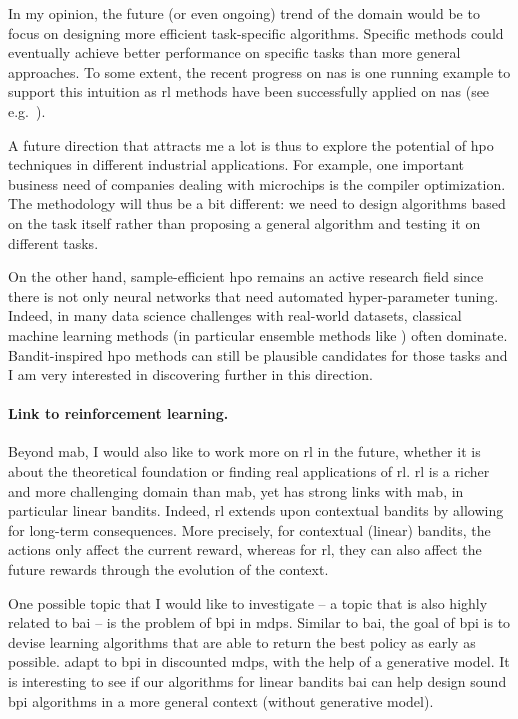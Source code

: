 In my opinion, the future (or even ongoing) trend of the domain would be to focus on designing more efficient task-specific algorithms. Specific methods could eventually achieve better performance on specific tasks than more general approaches. To some extent, the recent progress on \gls{nas} is one running example to support this intuition as \gls{rl} methods have been successfully applied on \gls{nas} (see e.g.~\citealt{zoph2017}).

A future direction that attracts me a lot is thus to explore the potential of \gls{hpo} techniques in different industrial applications. For example, one important business need of companies dealing with microchips is the compiler optimization. The methodology will thus be a bit different: we need to design algorithms based on the task itself rather than proposing a general algorithm and testing it on different tasks.

On the other hand, sample-efficient \gls{hpo} remains an active research field since there is not only neural networks that need automated hyper-parameter tuning. Indeed, in many data science challenges with real-world datasets, classical machine learning methods (in particular ensemble methods like \XG{}) often dominate. Bandit-inspired \gls{hpo} methods can still be plausible candidates for those tasks and I am very interested in discovering further in this direction.

\paragraph{Link to reinforcement learning.}
Beyond \gls{mab}, I would also like to work more on \gls{rl} in the future, whether it is about the theoretical foundation or finding real applications of \gls{rl}. \gls{rl} is a richer and more challenging domain than \gls{mab}, yet has strong links with \gls{mab}, in particular linear bandits. Indeed, \gls{rl} extends upon contextual bandits by allowing for long-term consequences. More precisely, for contextual (linear) bandits, the actions only affect the current reward, whereas for \gls{rl}, they can also affect the future rewards through the evolution of the context.


One possible topic that I would like to investigate -- a topic that is also highly related to \gls{bai} -- is the problem of \gls{bpi} in \gls{mdp}s. Similar to \gls{bai}, the goal of \gls{bpi} is to devise learning algorithms that are able to return the best policy as early as possible. \cite{marjani2020bpi} adapt \Track to \gls{bpi} in discounted \gls{mdp}s, with the help of a generative model. It is interesting to see if our algorithms for linear bandits \gls{bai} can help design sound \gls{bpi} algorithms in a more general context (without generative model).

